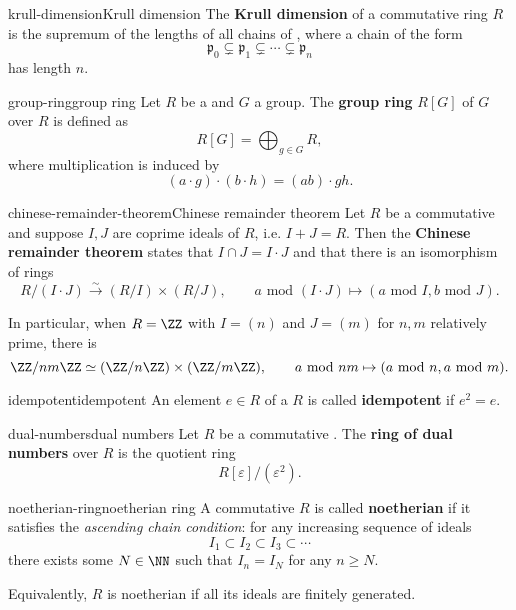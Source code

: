 \begin{topic}{krull-dimension}{Krull dimension}
    The \textbf{Krull dimension} of a commutative ring $R$ is the supremum of the lengths of all chains of , where a chain of the form
    \[ \mathfrak{p}_0 \subsetneq \mathfrak{p}_1 \subsetneq \cdots \subsetneq \mathfrak{p}_n \]
    has length $n$.
\end{topic}

\begin{topic}{group-ring}{group ring}
    Let $R$ be a  and $G$ a group. The \textbf{group ring} $R[G]$ of $G$ over $R$ is defined as
    \[ R[G] = \bigoplus_{g \in G} R , \]
    where multiplication is induced by
    \[ (a \cdot g) \cdot (b \cdot h) = (ab) \cdot gh . \]
\end{topic}

\begin{topic}{chinese-remainder-theorem}{Chinese remainder theorem}
    Let $R$ be a commutative  and suppose $I, J$ are coprime ideals of $R$, i.e. $I + J = R$. Then the \textbf{Chinese remainder theorem} states that $I \cap J = I \cdot J$ and that there is an isomorphism of rings
    \[ R / (I \cdot J) \xrightarrow{\sim} (R / I) \times (R/J), \qquad a \text{ mod } (I \cdot J) \mapsto (a \text{ mod } I, b \text{ mod } J) . \]
    
    In particular, when $R = \ZZ$ with $I = (n)$ and $J = (m)$ for $n, m$ relatively prime, there is
    \[ \ZZ / nm \ZZ \simeq (\ZZ/n\ZZ) \times (\ZZ/m\ZZ), \qquad a \text{ mod } nm \mapsto (a \text{ mod } n, a \text{ mod } m) . \]
\end{topic}

\begin{topic}{idempotent}{idempotent}
    An element $e \in R$ of a  $R$ is called \textbf{idempotent} if $e^2 = e$.
\end{topic}

\begin{topic}{dual-numbers}{dual numbers}
    Let $R$ be a commutative . The \textbf{ring of dual numbers} over $R$ is the quotient ring
    \[ R[\varepsilon] / (\varepsilon^2) . \]
\end{topic}

\begin{topic}{noetherian-ring}{noetherian ring}
    A commutative  $R$ is called \textbf{noetherian} if it satisfies the \textit{ascending chain condition}: for any increasing sequence of ideals
    \[ I_1 \subset I_2 \subset I_3 \subset \cdots \]
    there exists some $N \in \NN$ such that $I_n = I_N$ for any $n \ge N$.
    
    Equivalently, $R$ is noetherian if all its ideals are finitely generated.
\end{topic}

